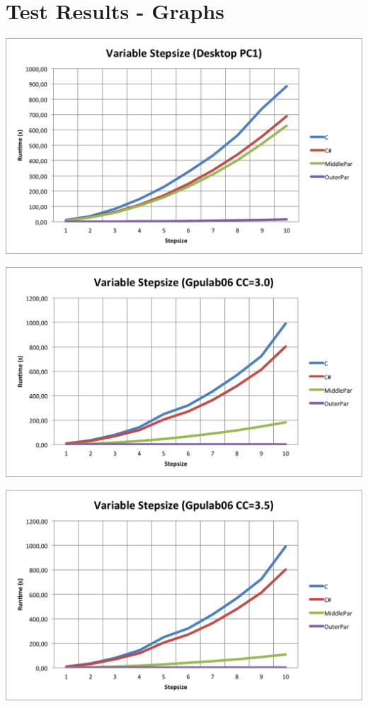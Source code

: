 \appendix
\section{Test Results - Graphs}

\centerline{\includegraphics[width=\textwidth]{img/desktop-stepsize.png}} 

\centerline{\includegraphics[width=\textwidth]{img/Gpulab-stepsize30.png}}

\centerline{\includegraphics[width=\textwidth]{img/Gpulab-stepsize35.png}}

